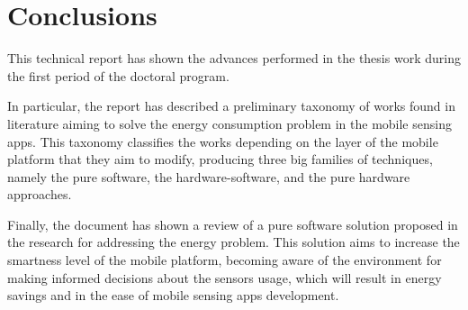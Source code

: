 \section{Conclusions}
\label{sec:conclusions}


This technical report has shown the advances performed in the thesis work during the first period of the doctoral program.

In particular, the report has described a preliminary taxonomy of works found in literature aiming to solve the energy consumption problem in the mobile sensing apps.
This taxonomy classifies the works depending on the layer of the mobile platform that they aim to modify, producing three big families of techniques, namely the pure software, the hardware-software, and the pure hardware approaches.


Finally, the document has shown a review of a pure software solution proposed in the research for addressing the energy problem.
This solution aims to increase the smartness level of the mobile platform, becoming aware of the environment for making informed decisions about the sensors usage, which will result in energy savings and in the ease of mobile sensing apps development.
